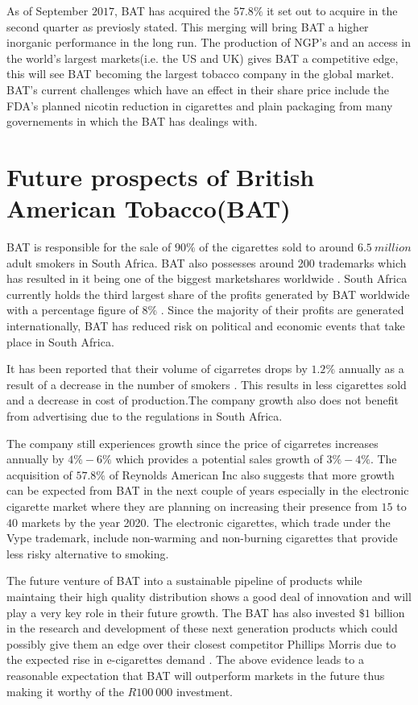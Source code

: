 \documentclass[letterpaper, 10 pt, conference]{ieeeconf}  %
\begin{document}
 	As of September $2017$,  BAT has acquired the $57.8\%$ it set out to acquire in the second quarter as previosly stated. This merging will bring BAT a higher inorganic performance in the long run. The production of NGP's and an access in the world's largest markets(i.e. the US and UK) gives BAT a competitive edge, this will see BAT becoming the largest tobacco company in the global market. BAT's current challenges which have an effect in their share price include the FDA's planned nicotin reduction in cigarettes and plain packaging from many governements in which the BAT has dealings with.


\section{Future prospects of British American Tobacco(BAT)}
BAT is responsible for the sale of $90\%$ of the cigarettes sold to around $6.5~million$ adult smokers in South Africa. BAT also possesses around 200 trademarks which has resulted in it being one of the biggest marketshares worldwide \cite{BAT_hist}. South Africa currently holds the third largest share of the profits generated by BAT worldwide with a percentage figure of $8\%$ \cite{BAT_hist}. Since the majority of their profits are generated internationally, BAT has reduced risk on political and economic events that take place in South Africa.

It has been reported that their volume of cigarretes drops by $1.2\%$ annually as a result of a decrease in the number of smokers \cite{BAT_nextgen}. This results in less cigarettes sold and a decrease in cost of production.The company growth also does not benefit from advertising due to the regulations in South Africa.

The company still experiences growth since the price of cigarretes increases annually by $4\%-6\%$ \cite{BAT_hist} which provides a potential sales growth of $3\%-4\%$. The acquisition of $57.8\%$ of Reynolds American Inc \cite{BAT_vap} also suggests that more growth can be expected from BAT in the next couple of years especially in the electronic cigarette market where they are planning on increasing their presence from $15$ to $40$ markets by the year 2020. The electronic cigarettes, which trade under the Vype trademark, include non-warming and non-burning cigarettes that provide less risky alternative to smoking.

The future venture of BAT into a sustainable pipeline of products while maintaing their high quality distribution shows a good deal of innovation and will play a very key role in their future growth. The BAT has also invested $\$1$ billion in the research and development of these next generation products which could possibly give them an edge over their closest competitor Phillips Morris due to the expected rise in e-cigarettes demand \cite{BAT_comp}\cite{BAT_nextgen}. The above evidence leads to a reasonable expectation that BAT will outperform markets in the future thus making it worthy of the $R100 ~ 000$ investment.
\end{document}
